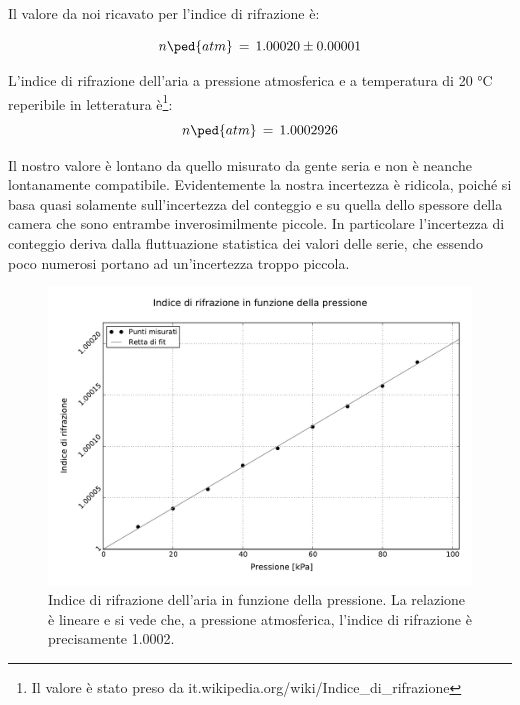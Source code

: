 Il valore da noi ricavato per l'indice di rifrazione è:

\begin{equation}
	n\ped{atm} \, = \, 1.00020 \pm 0.00001
\end{equation}

L'indice di rifrazione dell'aria a pressione atmosferica e a temperatura di 20 $\si{\degreeCelsius}$ reperibile in letteratura è\footnote{Il valore è stato preso da it.wikipedia.org/wiki/Indice\_di\_rifrazione}:
\begin{equation}
n\ped{atm} \, = \, 1.000 292 6
\end{equation}

Il nostro valore è lontano da quello misurato da gente seria e non è neanche lontanamente compatibile. Evidentemente la nostra incertezza
è ridicola, poiché si basa quasi solamente sull'incertezza del conteggio e su quella dello spessore della camera che sono entrambe inverosimilmente piccole. In particolare l'incertezza di conteggio deriva dalla fluttuazione statistica dei valori delle serie, che essendo poco numerosi portano ad un'incertezza troppo piccola.


\begin{figure}[t]
    \centering
        \includegraphics[width=\textwidth]{graph.pdf}
        \caption{Indice di rifrazione dell'aria in funzione della pressione. La relazione è lineare e si vede che, a pressione
			atmosferica, l'indice di rifrazione è precisamente 1.0002.}
        \label{fig:enne_press}
\end{figure}

